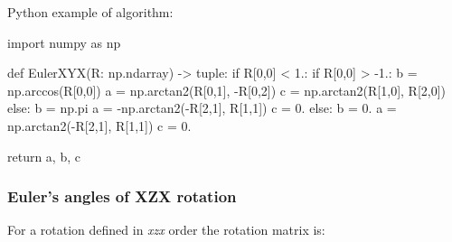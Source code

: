     Python example of algorithm:

\begin{python}
import numpy as np

def EulerXYX(R: np.ndarray) -> tuple:
    if R[0,0] < 1.:
        if R[0,0] > -1.:
            b = np.arccos(R[0,0])
            a = np.arctan2(R[0,1], -R[0,2])
            c = np.arctan2(R[1,0], R[2,0])
        else:
            b = np.pi
            a = -np.arctan2(-R[2,1], R[1,1])
            c = 0.
    else:
        b = 0.
        a = np.arctan2(-R[2,1], R[1,1])
        c = 0.

    return a, b, c
\end{python}

\subsubsection{Euler's angles of \textbf{XZX} rotation}

    For a rotation defined in \textit{xzx} order the rotation matrix is:

